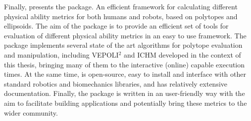 

Finally,  presents the  package.  An efficient framework for calculating different physical ability metrics for both humans and robots, based on polytopes and ellipsoids. The aim of the package is to provide an efficient set of tools for evaluation of different physical ability metrics in an easy to use framework. The package implements several state of the art algorithms for polytope evaluation and manipulation, including VEPOLI$^2$ and ICHM developed in the context of this thesis, bringing many of them to the interactive (online) capable execution times. At the same time,  is open-source, easy to install and interface with other standard robotics and biomechanics libraries, and has relatively extensive documentation. Finally, the package is written in an user-friendly way with the aim to facilitate building applications and potentially bring these metrics to the wider community.



